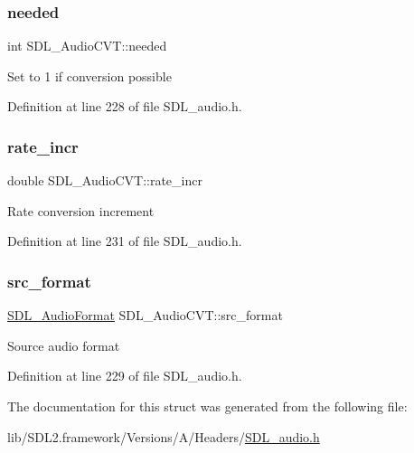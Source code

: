 \subsubsection{\texorpdfstring{needed}{needed}}
{\footnotesize\ttfamily int S\+D\+L\+\_\+\+Audio\+C\+V\+T\+::needed}

Set to 1 if conversion possible 

Definition at line 228 of file S\+D\+L\+\_\+audio.\+h.

\mbox{\label{struct_s_d_l___audio_c_v_t_ad886122c23a6673073baace31bff3b6c}} 
\subsubsection{\texorpdfstring{rate\_incr}{rate\_incr}}
{\footnotesize\ttfamily double S\+D\+L\+\_\+\+Audio\+C\+V\+T\+::rate\+\_\+incr}

Rate conversion increment 

Definition at line 231 of file S\+D\+L\+\_\+audio.\+h.

\mbox{\label{struct_s_d_l___audio_c_v_t_a6ae81231e017105e6d5e745a51732e16}} 
\subsubsection{\texorpdfstring{src\_format}{src\_format}}
{\footnotesize\ttfamily \mbox{\hyperlink{_s_d_l__audio_8h_a491ed103fd25d920c4e6b7495217ce66}{S\+D\+L\+\_\+\+Audio\+Format}} S\+D\+L\+\_\+\+Audio\+C\+V\+T\+::src\+\_\+format}

Source audio format 

Definition at line 229 of file S\+D\+L\+\_\+audio.\+h.



The documentation for this struct was generated from the following file\+:\begin{DoxyCompactItemize}
\item 
lib/\+S\+D\+L2.\+framework/\+Versions/\+A/\+Headers/\mbox{\hyperlink{_s_d_l__audio_8h}{S\+D\+L\+\_\+audio.\+h}}\end{DoxyCompactItemize}
